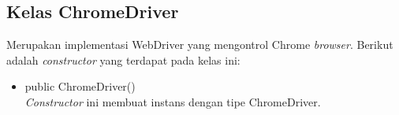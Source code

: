 

\subsection{Kelas ChromeDriver}
\label{subsec:chromedriver}
Merupakan implementasi WebDriver yang mengontrol Chrome \textit{browser}. Berikut adalah \textit{constructor} yang terdapat pada kelas ini:
\begin{itemize}
\item public ChromeDriver()\\
\textit{Constructor} ini membuat instans dengan tipe ChromeDriver.
\end{itemize}

